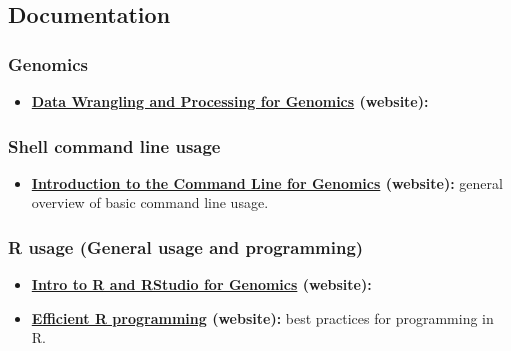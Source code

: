 \documentclass[
]{book}
\providecommand{\tightlist}{%
  \setlength{\itemsep}{0pt}\setlength{\parskip}{0pt}}
\begin{document}
\hypertarget{links-documentation}{%
\subsection{Documentation}\label{links-documentation}}

\hypertarget{genomics}{%
\subsubsection*{Genomics}\label{genomics}}

\begin{itemize}
\tightlist
\item
  \textbf{\href{https://datacarpentry.org/wrangling-genomics/}{Data Wrangling and Processing for Genomics} (website):}
\end{itemize}

\hypertarget{shell-command-line-usage}{%
\subsubsection*{Shell command line usage}\label{shell-command-line-usage}}

\begin{itemize}
\tightlist
\item
  \textbf{\href{https://datacarpentry.org/shell-genomics/}{Introduction to the Command Line for Genomics} (website):} general overview of basic command line usage.
\end{itemize}

\hypertarget{r-usage-general-usage-and-programming}{%
\subsubsection*{R usage (General usage and programming)}\label{r-usage-general-usage-and-programming}}

\begin{itemize}
\tightlist
\item
  \textbf{\href{https://datacarpentry.org/genomics-r-intro/}{Intro to R and RStudio for Genomics} (website):}
\item
  \textbf{\href{https://csgillespie.github.io/efficientR/index.html}{Efficient R programming} (website):} best practices for programming in R.
\end{itemize}
\end{document}
